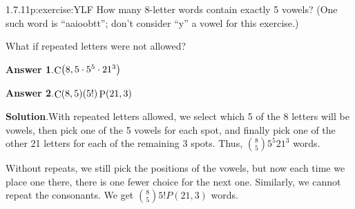 \documentclass[twoside,11pt,]{book}
\newcommand{\blocktitlefont}{\relax}
\numberwithin{equation}{chapter}
\begin{document}
\begin{divisionsolution}{1.7.11}{}{p:exercise:YLF}%
How many 8-letter words contain exactly 5 vowels? (One such word is ``aaioobtt''; don't consider ``y'' a vowel for this exercise.)%
\par
What if repeated letters were not allowed?%
\par\smallskip%
\noindent\textbf{\blocktitlefont Answer 1}.\quad{}\(\mathop{\rm C}\nolimits\!\left(8,5\cdot 5^{5}\cdot 21^{3}\right)\)%
\par\smallskip%
\noindent\textbf{\blocktitlefont Answer 2}.\quad{}\(\mathop{\rm C}\nolimits\!\left(8,5\right)\!\left(5!\right)\mathop{\rm P}\nolimits\!\left(21,3\right)\)%
\par\smallskip%
\noindent\textbf{\blocktitlefont Solution}.\quad{}With repeated letters allowed, we select which 5 of the 8 letters will be vowels, then pick one of the 5 vowels for each spot, and finally pick one of the other 21 letters for each of the remaining 3 spots. Thus, \({8 \choose 5}5^5 21^3\) words.%
\par
Without repeats, we still pick the positions of the vowels, but now each time we place one there, there is one fewer choice for the next one. Similarly, we cannot repeat the consonants. We get \({8 \choose 5}5!
P(21, 3)\) words.%
\end{divisionsolution}%
\end{document}
